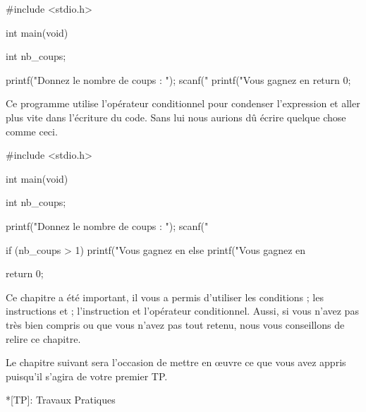 \begin{C}
 #include <stdio.h>

int main(void)
{
    int nb_coups;

    printf("Donnez le nombre de coups : ");
    scanf("%
    printf("Vous gagnez en %
    return 0;
}
\end{C}

Ce programme utilise l'opérateur conditionnel pour condenser
l'expression et aller plus vite dans l'écriture du code. Sans lui nous
aurions dû écrire quelque chose comme ceci.

\begin{C}
 #include <stdio.h>

int main(void)
{
    int nb_coups;

    printf("Donnez le nombre de coups : ");
    scanf("%

    if (nb_coups > 1)
        printf("Vous gagnez en %
    else
        printf("Vous gagnez en %

    return 0;
}
\end{C}

Ce chapitre a été important, il vous a permis d’utiliser les conditions ; les instructions  et ;
l’instruction  et l'opérateur conditionnel. Aussi, si vous n'avez pas très bien compris
ou que vous n'avez pas tout retenu, nous vous conseillons de relire ce
chapitre.

Le chapitre suivant sera l'occasion de mettre en œuvre ce que vous avez
appris puisqu'il s'agira de votre premier TP.

*{[}TP{]}: Travaux Pratiques